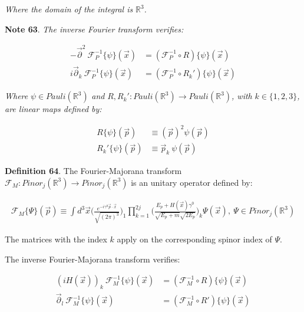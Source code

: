 \documentclass[11pt]{book}
\begin{document}
\emph{ Where the domain of the integral is }\(\mathbb{R}^3\)\emph{.}

\textbf{Note 63}. \emph{The inverse Fourier transform verifies: }

\begin{equation}\begin{aligned}
-\vec{\partial}^2\
\mathcal{F}_P^{-1}\{\psi\}(\vec{x})&=
(\mathcal{F}_P^{-1}\circ R)\{\psi\}(\vec{x})\\
i\vec{\partial}_k
\ \mathcal{F}_P^{-1}\{\psi\}(\vec{x})&=
(\mathcal{F}_P^{-1}\circ R_k')\{\psi\}(\vec{x})\end{aligned}\end{equation}

\emph{ Where }\(\psi\in Pauli(\mathbb{R}^3)\)\emph{ and
}\(R,R_k':Pauli(\mathbb{R}^3)\to Pauli(\mathbb{R}^3)\)\emph{, with
}\(k\in\{1,2,3\}\)\emph{, are linear maps defined by: }

\begin{equation}\begin{aligned}
R\{\psi\}(\vec{p})&\equiv (\vec{p})^2 \psi(\vec{p})\\
R_k'\{\psi\}(\vec{p})&\equiv \vec{p}_k\ \psi(\vec{p})\end{aligned}\end{equation}

\textbf{Definition 64}. The Fourier-Majorana transform
\(\mathcal{F}_M: Pinor_j(\mathbb{R}^3)\to Pinor_j(\mathbb{R}^3)\) is an
unitary operator defined by:

\begin{equation}\begin{aligned}
\mathcal{F}_M\{\Psi\}(\vec{p})\equiv\int d^3\vec{x}
\Big(\frac{e^{-i\gamma^0\vec{p}\cdot\vec{x}}}{\sqrt{(2\pi)^3}}\Big)_1
\prod_{k=1}^{2j}\Big(\frac{E_p+H(\vec{x})\gamma^0}{\sqrt{E_p+m}\sqrt{2E_p}}\Big)_k
\Psi(\vec{x}),\ \Psi\in Pinor_j(\mathbb{R}^3)\end{aligned}\end{equation}

The matrices with the index \(k\) apply on the corresponding spinor
index of \(\Psi\).

The inverse Fourier-Majorana transform verifies:

\begin{equation}\begin{aligned}
(iH(\vec{x}))_k\
\mathcal{F}_M^{-1}\{\psi\}(\vec{x})&=
(\mathcal{F}_M^{-1}\circ R)\{\psi\}(\vec{x})\\
\vec{\partial}_l\ \mathcal{F}_M^{-1}\{\psi\}(\vec{x})&=
(\mathcal{F}_M^{-1}\circ R')\{\psi\}(\vec{x})\end{aligned}\end{equation}
\end{document}
